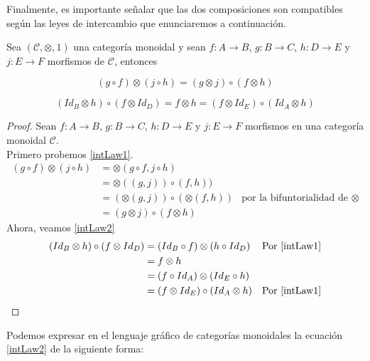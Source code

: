 \documentclass[../main.tex]{subfiles}
\begin{document}
Finalmente, es importante señalar que las dos composiciones son compatibles según las leyes de intercambio que enunciaremos a continuación.

\begin{prop}
	Sea $(\mathcal{C},\otimes , 1)$ una categoría monoidal y sean $f:A \to B$, $g:B \to C$, $h:D \to E$ y $j:E \to F$ morfismos de $\mathcal{C}$, entonces
	
	\begin{equation} \label{intLaw1}
		(g\circ f) \otimes (j \circ h) = (g \otimes j) \circ (f \otimes h)
	\end{equation}
	
	\begin{equation} \label{intLaw2}
		 (Id_B \otimes h) \circ (f \otimes Id_D) = f \otimes h = (f \otimes Id_E) \circ (Id_A \otimes h) 
	\end{equation} 
	 
\end{prop} 

\begin{proof}
	Sean $f:A \to B$, $g:B \to C$, $h:D \to E$ y $j:E \to F$ morfismos en una categoría monoidal $\mathcal{C}$. \\
	Primero probemos \ref{intLaw1}.
	\begin{align*}
		(g\circ f) \otimes (j \circ h) &= \otimes (g\circ f, j \circ h) \\
		&= \otimes ((g,j)) \circ (f,h))\\
		&=(\otimes (g,j)) \circ (\otimes (f,h)) & \text{por la bifuntorialidad de $\otimes$}\\
		&=(g \otimes j) \circ (f \otimes h)
	\end{align*}
	Ahora, veamos  \ref{intLaw2}
	\begin{align*}
		(Id_B \otimes h) \circ (f \otimes Id_D) &= (Id_B \circ f) \otimes (h \circ Id_D)	& \text{Por \ref{intLaw1}}\\
		&=f \otimes h \\
		&=(f \circ Id_A) \otimes (Id_E \circ h) \\
		&= (f \otimes Id_E) \circ (Id_A \otimes h) & \text{Por \ref{intLaw1}} 
	\end{align*}
\end{proof}

Podemos expresar en el lenguaje gráfico de categorías monoidales la ecuación \ref{intLaw2} de la siguiente forma:
\end{document}

